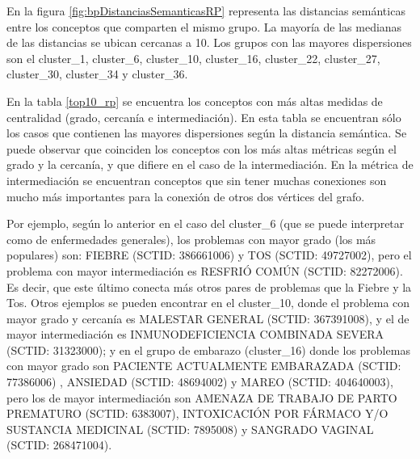 En la figura \ref{fig:bpDistanciasSemanticasRP} representa las distancias semánticas entre los conceptos que comparten el mismo grupo. La mayoría de las medianas de las distancias se ubican cercanas a 10. Los grupos con las mayores dispersiones son el cluster\_1, cluster\_6, cluster\_10, cluster\_16, cluster\_22, cluster\_27, cluster\_30, cluster\_34 y cluster\_36. 

En la tabla \ref{top10_rp} se encuentra los conceptos con más altas medidas de  centralidad (grado, cercanía e intermediación). En esta tabla se encuentran sólo los casos que contienen las mayores dispersiones según la distancia semántica. Se puede observar que coinciden los conceptos con los más altas métricas según el grado y la cercanía, y que difiere en el caso de la intermediación. En la métrica de intermediación se encuentran conceptos que sin tener muchas conexiones son mucho más importantes para la conexión de otros dos vértices del grafo.

Por ejemplo, según lo anterior en el caso del cluster\_6 (que se puede interpretar como de enfermedades generales), los problemas con mayor grado (los más populares) son: FIEBRE (SCTID: 386661006) y TOS (SCTID: 49727002), pero el problema con mayor intermediación es RESFRIÓ COMÚN (SCTID: 82272006). Es decir, que este último conecta más otros pares de problemas que la Fiebre y la Tos. Otros ejemplos se pueden encontrar en el cluster\_10, donde el problema con mayor grado y cercanía es MALESTAR GENERAL (SCTID: 367391008), y el de mayor intermediación es INMUNODEFICIENCIA COMBINADA SEVERA (SCTID: 31323000); y en el grupo de embarazo (cluster\_16) donde los problemas con mayor grado son PACIENTE ACTUALMENTE EMBARAZADA (SCTID: 77386006) , ANSIEDAD (SCTID: 48694002) y MAREO (SCTID: 404640003), pero los de mayor intermediación son AMENAZA DE TRABAJO DE PARTO PREMATURO (SCTID: 6383007), INTOXICACIÓN POR FÁRMACO Y/O SUSTANCIA MEDICINAL (SCTID: 7895008) y SANGRADO VAGINAL (SCTID: 268471004).

